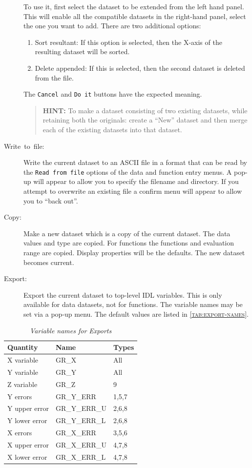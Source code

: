 \documentclass[11pt,twoside,english]{article}
\begin{document}
\begin{description}
  To use it, first select the dataset to be extended from the left hand
  panel. This will enable all the compatible datasets in the right-hand
  panel, select the one you want to add. There are two additional
  options:

  \begin{enumerate}
  \item Sort resultant: If this option is selected, then the X-axis of
    the resulting dataset will be sorted.
  \item Delete appended: If this is selected, then the second dataset
    is deleted from the file.
  \end{enumerate}
  The \texttt{Cancel} and \texttt{Do it} buttons have the expected
  meaning.

\begin{quote}
  \textsf{\textbf{HINT:}} \textsf{To make a dataset consisting of two
    existing datasets, while retaining both the originals: create a
    {}``New'' dataset and then merge each of the existing datasets into
    that dataset.}
\end{quote}
\item [Write~to~file:] Write the current dataset to an ASCII file in a
  format that can be read by the \texttt{Read from file} options of the
  data and function entry menus. A pop-up will appear to allow you to
  specify the filename and directory. If you attempt to overwrite an
  existing file a confirm menu will appear to allow you to {}``back
  out''.
\item[Copy:] Make a new dataset which is a copy of the current
  dataset. The data values and type are copied. For functions the
  functions and evaluation range are copied. Display properties will be
  the defaults. The new dataset becomes current.
\item[Export:] Export the current dataset to top-level IDL
  variables. This is only available for data datasets, not for
  functions. The variable names may be set via a pop-up menu. The
  default values are listed in
 \textsc{\autoref{tab:export-names}}. 
\end{description}
\begin{table}
  \centering
  \caption{\textit{Variable names for Exports}}
  \begin{tabular}{lll}
    \hline
    Quantity & Name & Types \\ \hline
    X variable & GR\_X & All \\
    Y variable & GR\_Y & All \\
    Z variable & GR\_Z & 9 \\
    Y errors & GR\_Y\_ERR & 1,5,7 \\
    Y upper error & GR\_Y\_ERR\_U & 2,6,8 \\
    Y lower error & GR\_Y\_ERR\_L & 2,6,8 \\
    X errors & GR\_X\_ERR & 3,5,6 \\
    X upper error & GR\_X\_ERR\_U & 4,7,8\\
    X lower error & GR\_X\_ERR\_L & 4,7,8\\
    \hline
  \end{tabular}
  \label{tab:export-names}
\end{table}
\end{document}
